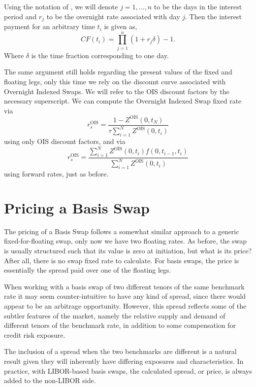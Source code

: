 Using the notation of \cite{veronesi2016handbook}, we will denote $j = 1, \ldots, n$ to be the days in the interest period and $r_j$ to be the overnight rate associated with day $j$. Then the interest payment for an arbitrary time $t_i$ is given as,
\begin{equation}
    CF(t_i) = \prod_{j=1}^{n} \left( 1 + r_j \delta \right) - 1.
\end{equation}
Where $\delta$ is the time fraction corresponding to one day. 

The same argument still holds regarding the present values of the fixed and floating legs, only this time we rely on the discount curve associated with Overnight Indexed Swaps. We will refer to the OIS discount factors by the necessary superscript. We can compute the Overnight Indexed Swap fixed rate via
\begin{equation}
    r_{s}^{\text{OIS}} = \frac{1 - Z^{\text{OIS}}(0, t_N)}{\tau \sum_{i=1}^{N} Z^{\text{OIS}}(0,t_i)}
\end{equation}
using only OIS discount factors, and via
\begin{equation}
    r_{s}^{\text{OIS}} = \frac{\sum_{i=1}^{N} Z^{\text{OIS}}(0,t_i) f(0,t_{i-1},t_i)}{\sum_{i=1}^{N} Z^{\text{OIS}}(0,t_i)}
\end{equation}
using forward rates, just as before. 

\section{Pricing a Basis Swap}
The pricing of a Basis Swap follows a somewhat similar approach to a generic fixed-for-floating swap, only now we have two floating rates. As before, the swap is usually structured such that its value is zero at initiation, but what is its price? After all, there is no swap fixed rate to calculate. For basis swaps, the price is essentially the spread paid over one of the floating legs. 

When working with a basis swap of two different tenors of the same benchmark rate it may seem counter-intuitive to have any kind of spread, since there would appear to be an arbitrage opportunity. However, this spread reflects some of the subtler features of the market, namely the relative supply and demand of different tenors of the benchmark rate, in addition to some compensation for credit risk exposure.

The inclusion of a spread when the two benchmarks are different is a natural result given they will inherently have differing exposures and characteristics. In practice, with LIBOR-based basis swaps, the calculated spread, or price, is always added to the non-LIBOR side. 


